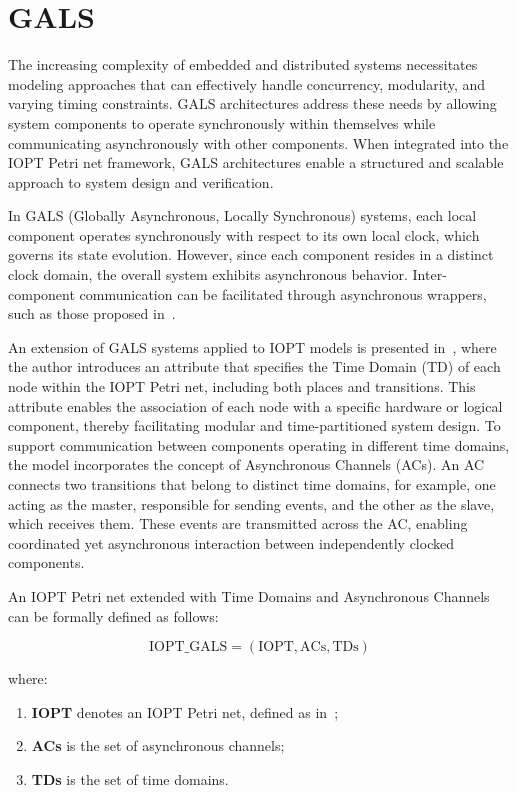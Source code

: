 \section{GALS}
\label{sec:gals}


The increasing complexity of embedded and distributed systems necessitates modeling approaches that can effectively handle concurrency, modularity, and varying timing constraints. GALS architectures address these needs by allowing system components to operate synchronously within themselves while communicating asynchronously with other components. When integrated into the IOPT Petri net framework, GALS architectures enable a structured and scalable approach to system design and verification.

In GALS (Globally Asynchronous, Locally Synchronous) systems, each local component operates synchronously with respect to its own local clock, which governs its state evolution. However, since each component resides in a distinct clock domain, the overall system exhibits asynchronous behavior. Inter-component communication can be facilitated through asynchronous wrappers, such as those proposed in~\cite{galsborman}.


An extension of GALS systems applied to IOPT models is presented in~\cite{galsactd}, where the author introduces an attribute that specifies the Time Domain (TD) of each node within the IOPT Petri net, including both places and transitions. This attribute enables the association of each node with a specific hardware or logical component, thereby facilitating modular and time-partitioned system design.
To support communication between components operating in different time domains, the model incorporates the concept of Asynchronous Channels (ACs). An AC connects two transitions that belong to distinct time domains, for example, one acting as the master, responsible for sending events, and the other as the slave, which receives them. These events are transmitted across the AC, enabling coordinated yet asynchronous interaction between independently clocked components.


An IOPT Petri net extended with Time Domains and Asynchronous Channels can be formally defined as follows:

\begin{equation}
\text{IOPT\_GALS} = (\text{IOPT}, \text{ACs}, \text{TDs})
\end{equation}

where:
\begin{enumerate}
    \item \textbf{IOPT} denotes an IOPT Petri net, defined as in~\cite{iopttools};
    \item \textbf{ACs} is the set of asynchronous channels;
    \item \textbf{TDs} is the set of time domains.
\end{enumerate}

